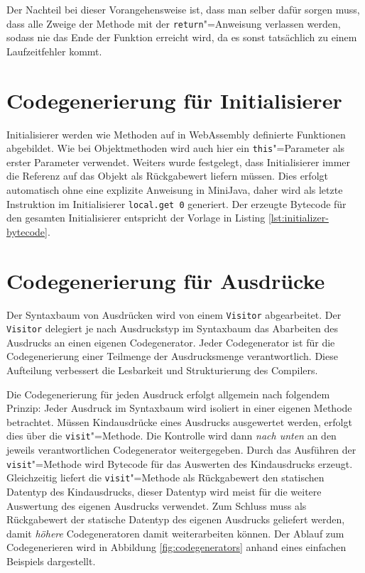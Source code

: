 Der Nachteil bei dieser Vorangehensweise ist, dass man selber dafür sorgen muss, dass alle Zweige der Methode mit der \lstinline{return}"=Anweisung verlassen werden, sodass nie das Ende der Funktion erreicht wird, da es sonst tatsächlich zu einem Laufzeitfehler kommt.

\pagebreak
\section{Codegenerierung für Initialisierer}

Initialisierer werden wie Methoden auf in WebAssembly definierte Funktionen abgebildet. Wie bei Objektmethoden wird auch hier ein \lstinline{this}"=Parameter als erster Parameter verwendet. Weiters wurde festgelegt, dass Initialisierer immer die Referenz auf das Objekt als Rückgabewert liefern müssen. Dies erfolgt automatisch ohne eine explizite Anweisung in MiniJava, daher wird als letzte Instruktion im Initialisierer \lstinline{local.get 0} generiert. Der erzeugte Bytecode für den gesamten Initialisierer entspricht der Vorlage in Listing \ref{lst:initializer-bytecode}.



\section{Codegenerierung für Ausdrücke}
\label{sec:Codegenerierung-für-Ausdrücke}

Der Syntaxbaum von Ausdrücken wird von einem \lstinline{Visitor} abgearbeitet. Der \lstinline{Visitor} delegiert je nach Ausdruckstyp im Syntaxbaum das Abarbeiten des Ausdrucks an einen eigenen Codegenerator. Jeder Codegenerator ist für die Codegenerierung einer Teilmenge der Ausdrucksmenge verantwortlich. Diese Aufteilung verbessert die Lesbarkeit und Strukturierung des Compilers.

Die Codegenerierung für jeden Ausdruck erfolgt allgemein nach folgendem Prinzip: Jeder Ausdruck im Syntaxbaum wird isoliert in einer eigenen Methode betrachtet. Müssen Kindausdrücke eines Ausdrucks ausgewertet werden, erfolgt dies über die \lstinline{visit}"=Methode. Die Kontrolle wird dann \emph{nach unten} an den jeweils verantwortlichen Codegenerator weitergegeben. Durch das Ausführen der \lstinline{visit}"=Methode wird Bytecode für das Auswerten des Kindausdrucks erzeugt. Gleichzeitig liefert die \lstinline{visit}"=Methode als Rückgabewert den statischen Datentyp des Kindausdrucks, dieser Datentyp wird meist für die weitere Auswertung des eigenen Ausdrucks verwendet. Zum Schluss muss als Rückgabewert der statische Datentyp des eigenen Ausdrucks geliefert werden, damit \emph{höhere} Codegeneratoren damit weiterarbeiten können. Der Ablauf zum Codegenerieren wird in Abbildung \ref{fig:codegenerators} anhand eines einfachen Beispiels dargestellt.

